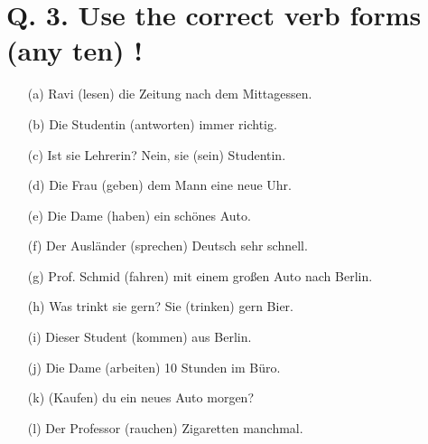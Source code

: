 \documentclass{article}
\begin{document}
\section*{Q. 3. Use the correct verb forms (any ten) !}
\begin{enumerate}
    \item[(a)] Ravi (lesen) die Zeitung nach dem Mittagessen.
    \item[(b)] Die Studentin (antworten) immer richtig.
    \item[(c)] Ist sie Lehrerin? Nein, sie (sein) Studentin.
    \item[(d)] Die Frau (geben) dem Mann eine neue Uhr.
    \item[(e)] Die Dame (haben) ein schönes Auto.
    \item[(f)] Der Ausländer (sprechen) Deutsch sehr schnell.
    \item[(g)] Prof. Schmid (fahren) mit einem großen Auto nach Berlin.
    \item[(h)] Was trinkt sie gern? Sie (trinken) gern Bier.
    \item[(i)] Dieser Student (kommen) aus Berlin.
    \item[(j)] Die Dame (arbeiten) 10 Stunden im Büro.
    \item[(k)] (Kaufen) du ein neues Auto morgen?
    \item[(l)] Der Professor (rauchen) Zigaretten manchmal.
\end{enumerate}
\end{document}
